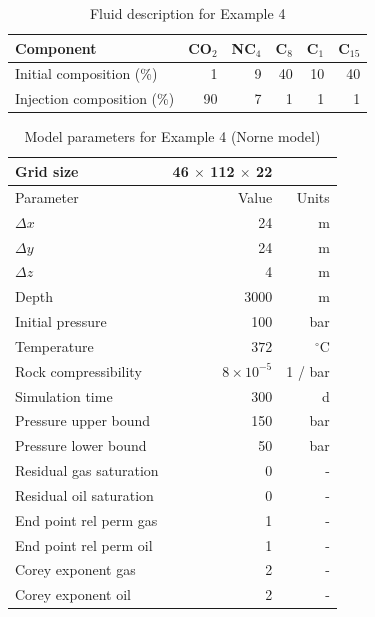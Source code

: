 \documentclass[twocolumn,numbook]{svjour3}          %
\begin{document}
\begin{table}
\centering
\caption{Fluid description for Example 4}
\begin{tabular}{|l|r|r|r|r|r|}
\hline
Component            & CO$_2$ & NC$_4$ & C$_8$ & C$_1$ & C$_{15}$  \\
\hline
Initial composition (\%)   & 1    & 9  & 40  & 10  & 40   \\
Injection composition (\%) & 90   & 7  &  1  &  1  &  1  \\
\hline
\end{tabular}
\label{table:NorneModelFluid}
\end{table}

\begin{table}
\centering
\caption{Model parameters for Example 4 (Norne model)}
\begin{tabular}{|l|rr|}
\hline
Grid size                & 46 $\times$ 112 $\times$ 22 &           \\
\hline\hline
Parameter                & Value    & Units \\
\hline
\hline
$\Delta x$               & 24        & m    \\
$\Delta y$               & 24        & m    \\
$\Delta z$               &  4        & m    \\
Depth                    & 3000      & m    \\
Initial pressure         & 100       & bar  \\
Temperature              &$372$      & $^\circ$C \\
Rock compressibility     &$8 \times 10^{-5}$ & 1 / bar \\
Simulation time          &300        & d          \\
Pressure upper bound     & 150       & bar      \\
Pressure lower bound     &  50       & bar      \\
\hline
Residual gas saturation  & 0    & -    \\
Residual oil saturation  & 0    & -    \\
End point rel perm gas   & 1    & -    \\
End point rel perm oil   & 1    & -    \\
Corey exponent gas       & 2    & -    \\
Corey exponent oil       & 2    & -    \\
\hline
\end{tabular}
\label{table:NorneReservoir}
\end{table}
\end{document}

